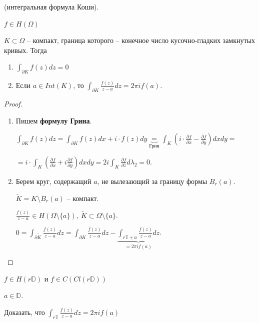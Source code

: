 \begin{theorem}
    (интегральная формула Коши).

    $f \in H(\Omega)$

    $K \subset \Omega$ -- компакт, граница которого -- конечное число кусочно-гладких замкнутых кривых. Тогда 

    \begin{enumerate}
        \item {
            $\int_{\partial K} { f(z) dz } = 0$
        }
        \item {
            Если $a \in Int (K)$, то $\int_{\partial K} { \frac{f(z)}{z - a} dz } = 2 \pi i f(a)$.
        }
    \end{enumerate}
\end{theorem}
\begin{proof}
    \begin{enumerate}
        \item {
            Пишем \textbf{формулу Грина}.

            $\int_{\partial K} { f(z) dz } = \int_{\partial K} { f(z) dx + i \cdot f(z) dy } \underbrace{=}_{\text{Грин}} \int_{K} { \left( i \cdot \frac{\partial f}{\partial x}  - \frac{\partial f}{\partial y} \right) dx dy } = $
            
            $ = i \cdot \int_{K} {\left( \frac{\partial f}{\partial x} + i \frac{\partial f}{\partial y} \right) dx dy} = 2 i \int_{K} { \frac{\partial f}{\partial \overline{z}} d \lambda_2 } = 0$.
        }
        \item {
            Берем круг, содержащий $a$, не вылезающий за границу формы $B_r(a)$.
            
            $\tilde{K} = K \setminus B_r(a)$ -- компакт.

            $\frac{f(z)}{z - a} \in H(\Omega \setminus \{ a \}), \ \tilde{K} \subset \Omega \setminus \{ a \}$.

            $0 = \int_{\partial \tilde{K}} { \frac{f(z)}{z - a} dz } = \int_{\partial K} { \frac{f(z)}{z - a} dz } - \underbrace{\int_{r \mathbb{T} + a} { \frac{f(z)}{z - a} dz }}_{= 2\pi i f(a)}$.
        }
    \end{enumerate}
\end{proof}
\begin{exerc}
    $f \in H(r \mathbb{D})$ и $f \in C(Cl (r \mathbb{D}))$

    $a \in \mathbb{D}$.
    
    Доказать, что $\int_{r \mathbb{T}} { \frac{f(z)}{z - a} dz } = 2 \pi i f(a)$
\end{exerc}

